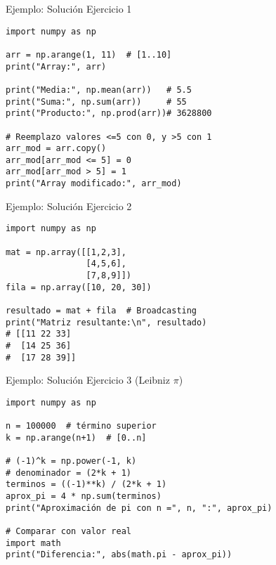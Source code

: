 \documentclass[10pt]{beamer}
\begin{document}
\begin{frame}[fragile]{Ejemplo: Solución Ejercicio 1}
\begin{verbatim}
import numpy as np

arr = np.arange(1, 11)  # [1..10]
print("Array:", arr)

print("Media:", np.mean(arr))   # 5.5
print("Suma:", np.sum(arr))     # 55
print("Producto:", np.prod(arr))# 3628800

# Reemplazo valores <=5 con 0, y >5 con 1
arr_mod = arr.copy()
arr_mod[arr_mod <= 5] = 0
arr_mod[arr_mod > 5] = 1
print("Array modificado:", arr_mod)
\end{verbatim}
\end{frame}

\begin{frame}[fragile]{Ejemplo: Solución Ejercicio 2}
\begin{verbatim}
import numpy as np

mat = np.array([[1,2,3],
                [4,5,6],
                [7,8,9]])
fila = np.array([10, 20, 30])

resultado = mat + fila  # Broadcasting
print("Matriz resultante:\n", resultado)
# [[11 22 33]
#  [14 25 36]
#  [17 28 39]]
\end{verbatim}
\end{frame}

\begin{frame}[fragile]{Ejemplo: Solución Ejercicio 3 (Leibniz \(\pi\))}
\begin{verbatim}
import numpy as np

n = 100000  # término superior
k = np.arange(n+1)  # [0..n]

# (-1)^k = np.power(-1, k)
# denominador = (2*k + 1)
terminos = ((-1)**k) / (2*k + 1)
aprox_pi = 4 * np.sum(terminos)
print("Aproximación de pi con n =", n, ":", aprox_pi)

# Comparar con valor real
import math
print("Diferencia:", abs(math.pi - aprox_pi))
\end{verbatim}
\end{frame}
\end{document}
